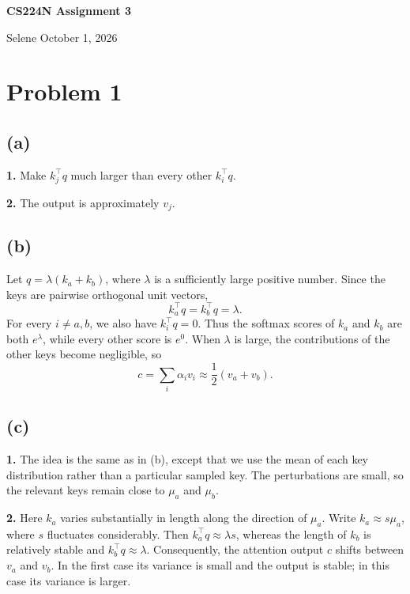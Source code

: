 \documentclass[a4paper,10pt]{article}
\begin{document}
\begin{center}
  {\Large\bfseries CS224N \textbar{} Assignment 3\par}
  \vspace{0.5em}
  Selene \quad\textperiodcentered\quad October 1, 2026
\end{center}
\vspace{0.7em}

\section{Problem 1}

\subsection{(a)}
\noindent\textbf{1.} Make \(k_j^\top q\) much larger than every other \(k_i^\top q\).

\noindent\textbf{2.} The output is approximately \(v_j\).

\subsection{(b)}
Let \(q=\lambda(k_a+k_b)\), where \(\lambda\) is a sufficiently large positive number. Since the keys are pairwise orthogonal unit vectors,
\[
k_a^\top q=k_b^\top q=\lambda.
\]
For every \(i\ne a,b\), we also have \(k_i^\top q=0\). Thus the softmax scores of \(k_a\) and \(k_b\) are both \(e^\lambda\), while every other score is \(e^0\). When \(\lambda\) is large, the contributions of the other keys become negligible, so
\[
c=\sum_i\alpha_i v_i\approx\frac{1}{2}(v_a+v_b).
\]

\subsection{(c)}
\noindent\textbf{1.} The idea is the same as in (b), except that we use the mean of each key distribution rather than a particular sampled key. The perturbations are small, so the relevant keys remain close to \(\mu_a\) and \(\mu_b\).

\noindent\textbf{2.} Here \(k_a\) varies substantially in length along the direction of \(\mu_a\). Write \(k_a\approx s\mu_a\), where \(s\) fluctuates considerably. Then \(k_a^\top q\approx\lambda s\), whereas the length of \(k_b\) is relatively stable and \(k_b^\top q\approx\lambda\). Consequently, the attention output \(c\) shifts between \(v_a\) and \(v_b\). In the first case its variance is small and the output is stable; in this case its variance is larger.
\end{document}

